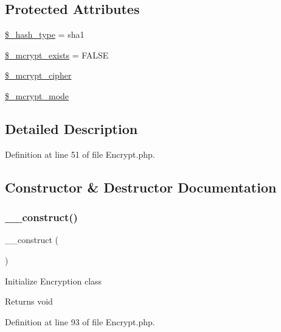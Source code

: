\subsection*{Protected Attributes}
\begin{DoxyCompactItemize}
\item 
\mbox{\hyperlink{class_c_i___encrypt_a04e9d4ea0e45fc04c07aa1e291e17412}{\$\+\_\+hash\+\_\+type}} = \textquotesingle{}sha1\textquotesingle{}
\item 
\mbox{\hyperlink{class_c_i___encrypt_aaf4246798dad057cc4e294706e5e4e37}{\$\+\_\+mcrypt\+\_\+exists}} = F\+A\+L\+SE
\item 
\mbox{\hyperlink{class_c_i___encrypt_ab2cdedd99c4818b191c667f5e081a2db}{\$\+\_\+mcrypt\+\_\+cipher}}
\item 
\mbox{\hyperlink{class_c_i___encrypt_ace4d98b5320c7fe75e6a38505abcdb82}{\$\+\_\+mcrypt\+\_\+mode}}
\end{DoxyCompactItemize}


\subsection{Detailed Description}


Definition at line 51 of file Encrypt.\+php.



\subsection{Constructor \& Destructor Documentation}
\mbox{\label{class_c_i___encrypt_a095c5d389db211932136b53f25f39685}} 
\subsubsection{\texorpdfstring{\_\_construct()}{\_\_construct()}}
{\footnotesize\ttfamily \+\_\+\+\_\+construct (\begin{DoxyParamCaption}{ }\end{DoxyParamCaption})}

Initialize Encryption class

\begin{DoxyReturn}{Returns}
void 
\end{DoxyReturn}


Definition at line 93 of file Encrypt.\+php.




